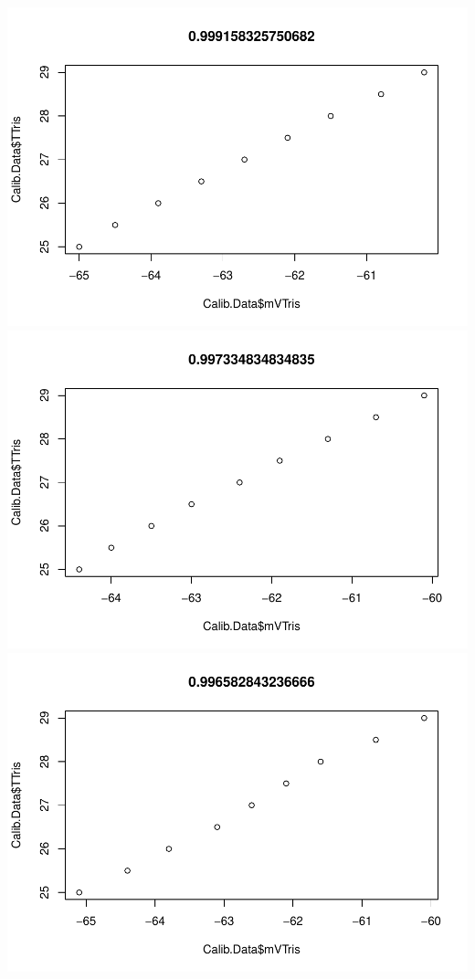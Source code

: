 \documentclass[
]{article}
\begin{document}
\includegraphics{daily-measurements_files/figure-latex/unnamed-chunk-5-10.pdf}
\includegraphics{daily-measurements_files/figure-latex/unnamed-chunk-5-11.pdf}
\includegraphics{daily-measurements_files/figure-latex/unnamed-chunk-5-12.pdf}
\end{document}
